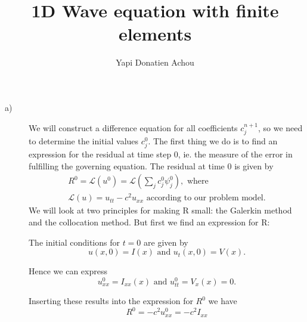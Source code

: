 \documentclass[a4paper,10pt]{article}
\title{1D Wave equation with finite elements}
\author{Yapi Donatien Achou}
\begin{document}
\maketitle

\begin{description}
\item[a)]

We will construct a difference equation for all coefficients $c^{n+1}_j$, so we need to determine the initial values $c^0_j$. 
The first thing we do is to find an expression for the residual at time step 0, ie. the measure of the error in fulfilling the governing equation. 
The residual at time 0 is given by
\begin{multline*}
 R^0 = \mathcal{L} (u^0) = \mathcal{L} (\sum_j c_j^0 \psi_j^0 ), \text{ where } \\
 \mathcal{L} (u) = u_{tt} -c^2 u_{xx} \text{ according to our problem model.}
 \end{multline*}
We will look at two principles for making R small: the Galerkin method and the collocation method. But first we find an expression for R:

The initial conditions for $t = 0$ are given by 
\begin{equation*}
 u(x,0) = I(x) \text{ and } u_t(x,0) = V(x).
 \end{equation*}

Hence we can express 
\begin{equation*}
 u_{xx}^0 = I_{xx} (x) \text{ and } u_{tt}^0 = V_x(x)= 0.
\end{equation*}

Inserting these results into the expression for $R^0$ we have
\[ R^0 =  -c^2 u_{xx}^0 = -c^2 I_{xx}  \]


\end{description}
\end{document}
